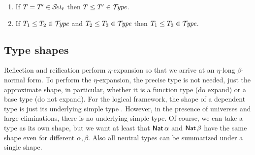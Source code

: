 \documentclass[acmsmall%
]{acmart}\settopmatter{printfolios=true}
\begin{document}
\begin{lemma}
\label{lem:preord}
\bla
\begin{enumerate}
\item If\/ $T = T' \in \SET[\ell]$ then $T \leq T' \in \TYPE$.
\item If\/ $T_1 \leq T_2 \in \TYPE$ and $T_2 \leq T_3 \in \TYPE$ then $T_1 \leq T_3 \in \TYPE$.
\end{enumerate}
\end{lemma}





\subsection{Type shapes}
\label{sec:shape}

Reflection and reification perform $\eta$-expansion so that we arrive at an $\eta$-long $\beta$-normal form.  To perform the $\eta$-expansion, the precise type is not needed, just the approximate shape, in particular, whether it is a function type (do expand) or a base type (do not expand).
For the logical framework, the shape of a dependent type is just its
underlying simple type \cite{harperPfenning:equivalenceLF}. However,
in the presence of universes and large eliminations, there is no
underlying simple type.  Of course, we can take a type as its own
shape, but we want at least that $\Nat \alpha$ and $\Nat \beta$ have
the same shape even for different $\alpha, \beta$.
Also all neutral types can be summarized under a single shape.
\end{document}
